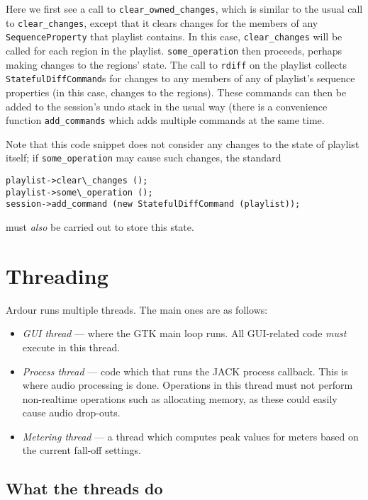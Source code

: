\documentclass[10pt,a4paper]{book}
\newcommand{\code}[1]{\texttt{#1}}
\begin{document}
Here we first see a call to \code{clear\_owned\_changes}, which is
similar to the usual call to \code{clear\_changes}, except that it
clears changes for the members of any \code{SequenceProperty} that
playlist contains.  In this case, \code{clear\_changes} will be called
for each region in the playlist.  \code{some\_operation} then
proceeds, perhaps making changes to the regions' state.  The call to
\code{rdiff} on the playlist collects \code{StatefulDiffCommand}s for
changes to any members of any of playlist's sequence properties (in
this case, changes to the regions).  These commands can then be added
to the session's undo stack in the usual way (there is a convenience
function \code{add\_commands} which adds multiple commands at the
same time.

Note that this code snippet does not consider any changes to the state
of playlist itself; if \code{some\_operation} may cause such changes,
the standard

\begin{lstlisting}
playlist->clear\_changes ();
playlist->some\_operation ();
session->add_command (new StatefulDiffCommand (playlist));
\end{lstlisting}

must \emph{also} be carried out to store this state.



\chapter{Threading}

Ardour runs multiple threads.  The main ones are as follows:

\begin{itemize}
\item \textit{GUI thread} --- where the GTK main loop runs.  All
  GUI-related code \textit{must} execute in this thread.
\item \textit{Process thread} --- code which that runs the JACK
  process callback.  This is where audio processing is done.
  Operations in this thread must not perform non-realtime operations
  such as allocating memory, as these could easily cause audio
  drop-outs.
\item \textit{Metering thread} --- a thread which computes peak values
  for meters based on the current fall-off settings.
\end{itemize}


\section{What the threads do}
\end{document}
